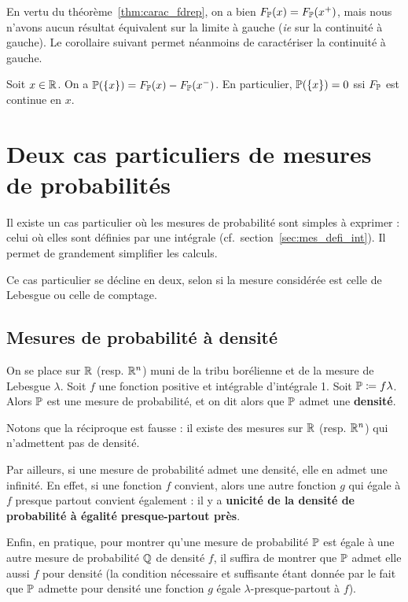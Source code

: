 \documentclass[../integ-proba.tex]{subfiles}
\begin{document}
    \begin{rem}
        En vertu du théorème~\ref{thm:carac_fdrep}, on a bien $F_{\mathbb{P}}(x) = F_{\mathbb{P}}(x^+)$, mais nous n'avons aucun résultat équivalent sur la limite à gauche (\textit{ie} sur la continuité à gauche).
        Le corollaire suivant permet néanmoins de caractériser la continuité à gauche.
    \end{rem}

    \begin{cor}
        Soit $x \in \mathbb{R}$.
        On a $\mathbb{P}(\left\{x\right\}) = F_{\mathbb{P}}(x) - F_{\mathbb{P}}(x^-)$.
        En particulier, $\mathbb{P}(\left\{x\right\}) = 0$ ssi $F_{\mathbb{P}}$ est continue en $x$.
    \end{cor}

    \section{Deux cas particuliers de mesures de probabilités}
    \label{sec:probas_mes_particulieres}

    Il existe un cas particulier où les mesures de probabilité sont simples à exprimer : celui où elles sont définies par une intégrale (cf.\ section~\ref{sec:mes_defi_int}).
    Il permet de grandement simplifier les calculs.

    Ce cas particulier se décline en deux, selon si la mesure considérée est celle de Lebesgue ou celle de comptage.

    \subsection{Mesures de probabilité à densité}
    \begin{defi}
        On se place sur $\mathbb{R}$ (resp. $\mathbb{R}^n$) muni de la tribu borélienne et de la mesure de Lebesgue $\lambda$.
        Soit $f$ une fonction positive et intégrable d'intégrale 1.
        Soit $\mathbb{P}\coloneqq f \lambda$.
        Alors $\mathbb{P}$ est une mesure de probabilité, et on dit alors que $\mathbb{P}$ admet une \textbf{densité}.
    \end{defi}

    \begin{rem}
        \label{rem:densite}
        Notons que la réciproque est fausse : il existe des mesures sur $\mathbb{R}$ (resp. $\mathbb{R}^n$) qui n'admettent pas de densité.

        Par ailleurs, si une mesure de probabilité admet une densité, elle en admet une infinité.
        En effet, si une fonction $f$ convient, alors une autre fonction $g$ qui égale à $f$ presque partout convient également : il y a \textbf{unicité de la densité de probabilité à égalité presque-partout près}. %

        Enfin, en pratique, pour montrer qu'une mesure de probabilité $\mathbb{P}$ est égale à une autre mesure de probabilité $\mathbb{Q}$ de densité $f$, il suffira de montrer que $\mathbb{P}$ admet elle aussi $f$ pour densité (la condition nécessaire et suffisante étant donnée par le fait que $\mathbb{P}$ admette pour densité une fonction $g$ égale $\lambda$-presque-partout à $f$).
    \end{rem}
\end{document}

